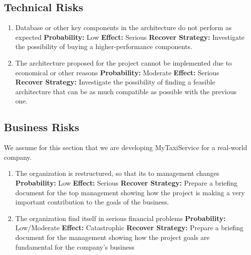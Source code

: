 \documentclass[11pt,titlepage]{article} %
\begin{document}
\subsection{Technical Risks}
  \begin{enumerate}
   \item Database or other key components in the architecture do not perform as expected\newline
    \textbf{Probability:} Low\newline
    \textbf{Effect:} Serious\newline
    \textbf{Recover Strategy:} Investigate the possibility of buying a higher-performance components.\newline
   \item The architecture proposed for the project cannot be implemented due to economical or other reasons\newline
    \textbf{Probability:} Moderate\newline
    \textbf{Effect:} Serious\newline
    \textbf{Recover Strategy:} Investigate the possibility of finding a feasible architecture that can be as much compatible as possible with the previous one.\newline
  \end{enumerate}

\subsection{Business Risks}
  We assume for this section that we are developing MyTaxiService for a real-world company.\newline
  \begin{enumerate}
   \item The organization is restructured, so that its to management changes\newline
    \textbf{Probability:} Low\newline
    \textbf{Effect:} Serious\newline
    \textbf{Recover Strategy:} Prepare a briefing document for the top management showing how the project is making a very important contribution to the goals of the business.\newline
   \item The organization find itself in serious financial problems\newline
    \textbf{Probability:} Low/Moderate\newline
    \textbf{Effect:} Catastrophic\newline
    \textbf{Recover Strategy:} Prepare a briefing document for the management showing how the project goals are fundamental for the company's business \newline
  \end{enumerate}
\end{document}
